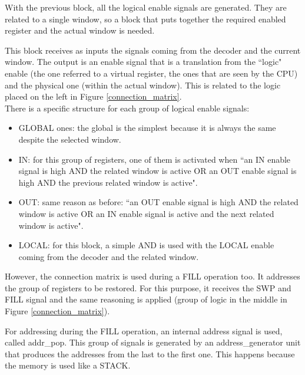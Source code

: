 With the previous block, all the logical enable signals are generated. They are related to a single window, so a block that puts together the required enabled register and the actual window is needed. 

This block receives as inputs the signals coming from the decoder and the current window. The output is an enable signal that is a translation from the ``logic" enable (the one referred to a virtual register, the ones that are seen by the CPU) and the physical one (within the actual window). This is related to the logic placed on the left in Figure \ref{connection_matrix}.\\

There is a specific structure for each group of logical enable signals:
\begin{itemize}
  \item GLOBAL ones: the global is the simplest because it is always the same despite the selected window.
  \item IN: for this group of registers, one of them is activated when ``an IN enable signal is high AND the related window is active OR an OUT enable signal is high AND the previous related window is active".
  \item OUT: same reason as before: ``an OUT enable signal is high AND the related window is active OR an IN enable signal is active and the next related window is active".
  \item LOCAL: for this block, a simple AND is used with the LOCAL enable coming from the decoder and the related window. 
\end{itemize}

However, the connection matrix is used during a FILL operation too. It addresses the group of registers to be restored. For this purpose, it receives the SWP and FILL signal and the same reasoning is applied (group of logic in the middle in Figure \ref{connection_matrix}).

For addressing during the FILL operation, an internal address signal is used, called addr\_pop. This group of signals is generated by an address\_generator unit that produces the addresses from the last to the first one. This happens because the memory is used like a STACK.\\

